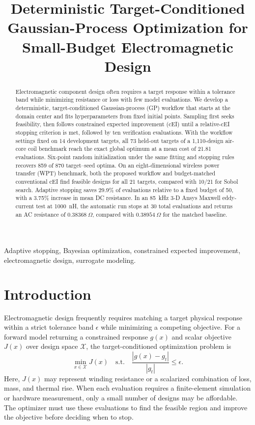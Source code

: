 \documentclass[10pt,conference,letterpaper]{IEEEtran}
\title{Deterministic Target-Conditioned Gaussian-Process Optimization for Small-Budget Electromagnetic Design}
\author{\IEEEauthorblockN{Le Dong}
\IEEEauthorblockA{\textit{School of Electrical Engineering}\\
\textit{Xi'an Jiaotong University}\\
Xi'an, Shaanxi 710049, China\\
\texttt{leroi\_2024@stu.xjtu.edu.cn}}}
\begin{document}
\maketitle

\begin{abstract}
Electromagnetic component design often requires a target response within a tolerance band while minimizing resistance or loss with few model evaluations. We develop a deterministic, target-conditioned Gaussian-process (GP) workflow that starts at the domain center and fits hyperparameters from fixed initial points. Sampling first seeks feasibility, then follows constrained expected improvement (cEI) until a relative-cEI stopping criterion is met, followed by ten verification evaluations. With the workflow settings fixed on 14 development targets, all 73 held-out targets of a 1,110-design air-core coil benchmark reach the exact global optimum at a mean cost of 21.81 evaluations. Six-point random initialization under the same fitting and stopping rules recovers 859 of 870 target--seed optima. On an eight-dimensional wireless power transfer (WPT) benchmark, both the proposed workflow and budget-matched conventional cEI find feasible designs for all 21 targets, compared with 10/21 for Sobol search. Adaptive stopping saves 29.9\% of evaluations relative to a fixed budget of 50, with a 3.75\% increase in mean DC resistance. In an 85~kHz 3-D Ansys Maxwell eddy-current test at 1000~nH, the automatic run stops at 30 total evaluations and returns an AC resistance of $0.38368~\Omega$, compared with $0.38954~\Omega$ for the matched baseline.
\end{abstract}

\begin{IEEEkeywords}
Adaptive stopping, Bayesian optimization, constrained expected improvement, electromagnetic design, surrogate modeling.
\end{IEEEkeywords}

\section{Introduction}
Electromagnetic design frequently requires matching a target physical response within a strict tolerance band $\epsilon$ while minimizing a competing objective. For a forward model returning a constrained response $g(x)$ and scalar objective $J(x)$ over design space $\mathcal X$, the target-conditioned optimization problem is
\begin{equation}
 \min_{x\in\mathcal X}J(x)\quad\mathrm{s.t.}\quad
 \frac{|g(x)-g_t|}{|g_t|}\leq\epsilon .
 \label{eq:problem}
\end{equation}
Here, $J(x)$ may represent winding resistance or a scalarized combination of loss, mass, and thermal rise. When each evaluation requires a finite-element simulation or hardware measurement, only a small number of designs may be affordable. The optimizer must use these evaluations to find the feasible region and improve the objective before deciding when to stop.
\end{document}
